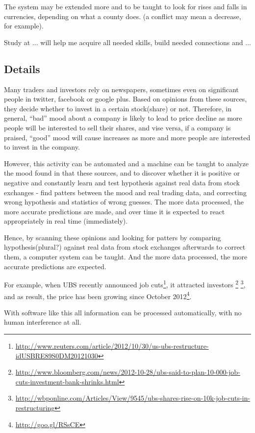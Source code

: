 \documentclass[a4paper,12pt]{article}
\begin{document}
The system may be extended more and to be taught to look for rises and falls in currencies, depending on what a county does. (a conflict may mean a decrease, for example).


Study at ... will help me acquire all needed skills, build needed connections and ...

\newpage

\subsection*{Details}

Many traders and investors rely on newspapers, sometimes even on significant people in twitter, facebook or google plus. Based on opinions from these sources, they decide whether to invest in a certain stock(share) or not. Therefore, in general, ``bad'' mood about a company is likely to lead to price decline as more people will be interested to sell their shares, and vise versa, if a company is praised, ``good'' mood will cause increases as more and more people are interested to invest in the company.

However, this activity can be automated and a machine can be taught to analyze the mood found in that these sources, and to discover whether it is positive or negative and constantly learn and test hypothesis against real data from stock exchanges - find patters between the mood and real trading data, and correcting wrong hypothesis and statistics of wrong guesses. The more data processed, the more accurate predictions are made, and over time it is expected to react appropriately in real time (immediately).

Hence, by scanning these opinions and looking for patters by comparing hypothesis(plural?) against real data from stock exchanges afterwards to correct them, a computer system can be taught. And the more data processed, the more accurate predictions are expected. 

For example, when UBS recently announced job cuts\footnote{\url{http://www.reuters.com/article/2012/10/30/us-ubs-restructure-idUSBRE89S0DM20121030}}, it attracted investors \footnote{\url{http://www.bloomberg.com/news/2012-10-28/ubs-said-to-plan-10-000-job-cuts-investment-bank-shrinks.html}} \footnote{\url{http://wbponline.com/Articles/View/9545/ubs-shares-rise-on-10k-job-cuts-in-restructuring}}, and as result, the price has been growing since October 2012\footnote{\url{http://goo.gl/RSsCE}}.

With software like this all information can be processed automatically, with no human interference at all.
\end{document}
